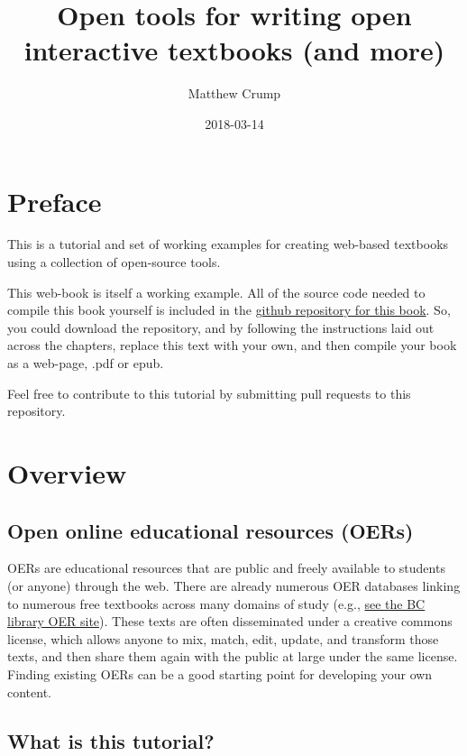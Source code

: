 \documentclass[]{book}
\title{Open tools for writing open interactive textbooks (and more)}
\author{Matthew Crump}
\date{2018-03-14}
\theoremstyle{definition}
\theoremstyle{definition}
\theoremstyle{definition}
\theoremstyle{remark}
\begin{document}
\maketitle

{
\setcounter{tocdepth}{1}
\tableofcontents
}
\chapter*{Preface}\label{preface}

This is a tutorial and set of working examples for creating web-based
textbooks using a collection of open-source tools.

This web-book is itself a working example. All of the source code needed
to compile this book yourself is included in the
\href{https://github.com/CrumpLab/OER_bookdown}{github repository for
this book}. So, you could download the repository, and by following the
instructions laid out across the chapters, replace this text with your
own, and then compile your book as a web-page, .pdf or epub.

Feel free to contribute to this tutorial by submitting pull requests to
this repository.

\chapter{Overview}\label{overview}

\section{Open online educational resources
(OERs)}\label{open-online-educational-resources-oers}

OERs are educational resources that are public and freely available to
students (or anyone) through the web. There are already numerous OER
databases linking to numerous free textbooks across many domains of
study (e.g., \href{http://libguides.brooklyn.cuny.edu/research/oer}{see
the BC library OER site}). These texts are often disseminated under a
creative commons license, which allows anyone to mix, match, edit,
update, and transform those texts, and then share them again with the
public at large under the same license. Finding existing OERs can be a
good starting point for developing your own content.

\section{What is this tutorial?}\label{what-is-this-tutorial}
\end{document}
